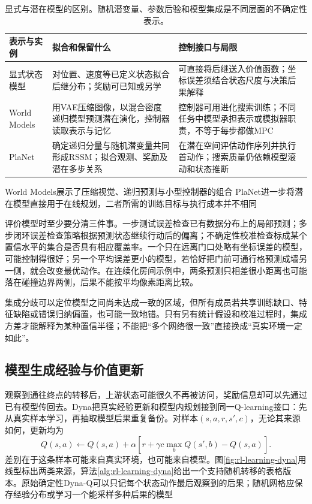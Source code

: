 \begin{table}[t]
  \centering
  \small
  \begin{tabularx}{\linewidth}{>{\raggedright\arraybackslash}p{25mm} >{\raggedright\arraybackslash}X >{\raggedright\arraybackslash}X}
    \toprule
    表示与实例 & 拟合和保留什么 & 控制接口与局限 \\
    \midrule
    显式状态模型 & 对位置、速度等已定义状态拟合后继分布；奖励可已知或另学 & 可直接将后继送入价值函数；坐标误差须结合状态尺度与决策后果解释 \\
    World Models & 用VAE压缩图像，以混合密度递归模型预测潜在演化，控制器读取表示与记忆 & 控制器可用进化搜索训练；不同任务中模型承担表示或模拟器职责，不等于每步都做MPC \\
    PlaNet & 确定递归分量与随机潜变量共同形成RSSM；拟合观测、奖励及潜在多步关系 & 在潜在空间评估动作序列并执行首动作；搜索质量仍依赖模型滚动和状态推断 \\
    \bottomrule
  \end{tabularx}
  \caption{显式与潜在模型的区别。随机潜变量、参数后验和模型集成是不同层面的不确定性表示。}
  \label{tab:rl-learning-model-representations}
\end{table}

World Models展示了压缩视觉、递归预测与小型控制器的组合
PlaNet进一步将潜在模型直接用于在线规划，二者所需的训练目标与执行成本并不相同

评价模型时至少要分清三件事。一步测试误差检查已有数据分布上的局部预测；多步闭环误差检查策略根据预测状态继续行动后的偏离；不确定性校准检查标成某个置信水平的集合是否具有相应覆盖率。一个只在远离门口处略有坐标误差的模型，可能控制得很好；另一个平均误差更小的模型，若恰好把门前可通行格预测成墙另一侧，就会改变最优动作。在连续化房间示例中，两条预测只相差很小距离也可能落在碰撞边界两侧，后果不能按平均像素距离比较。

集成分歧可以定位模型之间尚未达成一致的区域，但所有成员若共享训练缺口、特征缺陷或错误归纳偏置，也可能一致地错。只有另有统计假设和校准过程时，集成方差才能解释为某种置信半径；不能把“多个网络很一致”直接换成“真实环境一定如此”。

\subsection{模型生成经验与价值更新}
\label{sec:rl-learning-dyna}

观察到通往终点的转移后，上游状态可能很久不再被访问，奖励信息却可以先通过已有模型传回去。Dyna把真实经验更新和模型内规划接到同一Q-learning接口：先从真实样本学习，再抽取模型后果重复备份。对样本$(s,a,r,s',c)$，无论其来源如何，更新均为
\begin{equation}
  Q(s,a)\gets Q(s,a)+\alpha
  \left[r+\gamma c\max_bQ(s',b)-Q(s,a)\right].
  \label{eq:rl-learning-dyna-update}
\end{equation}
差别在于这条样本可能来自真实环境，也可能来自模型。图\ref{fig:rl-learning-dyna}用线型标出两类来源，算法\ref{alg:rl-learning-dyna}给出一个支持随机转移的表格版本。原始确定性Dyna-Q可以只记每个状态动作最后观察到的后果；随机网格应保存经验分布或学习一个能采样多种后果的模型

